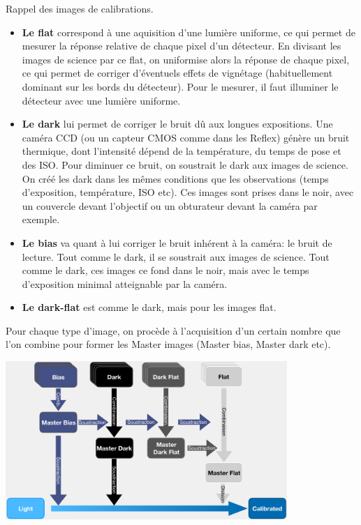 \documentclass[../main/main.tex]{subfiles}
\begin{document}
    \begin{frshaded*}
    \footnotesize
      \centerline{Rappel des images de calibrations.}
      \begin{itemize}
      \item \textbf{Le flat} correspond à une
        aquisition d'une lumière uniforme, ce qui permet de mesurer la réponse
        relative de chaque
        pixel d'un détecteur. En divisant les images de science par ce flat,
        on uniformise alors la réponse de chaque pixel, ce qui permet de
        corriger d'éventuels effets de vignétage (habituellement dominant sur
        les bords du détecteur). Pour le mesurer, il faut illuminer le
        détecteur avec une lumière uniforme. 
        
      \item \textbf{Le dark} lui permet de corriger le bruit dû aux longues
        expositions. Une caméra CCD (ou un capteur CMOS comme dans les
        Reflex) génère un bruit thermique, dont l'intensité dépend de la
        température, du temps de pose et des ISO. Pour diminuer ce bruit, on soustrait le dark aux images de
        science. On créé les dark dans les mêmes conditions que les
        observations (temps d'exposition, température, ISO etc). Ces images sont
        prises dans le noir, avec un couvercle devant
        l'objectif ou un obturateur devant la caméra par exemple.
        
      \item \textbf{Le bias} va quant à lui corriger le bruit inhérent à la
        caméra: le bruit de lecture. Tout comme le dark, il se soustrait
        aux images de science. Tout comme le dark, ces images ce fond
        dans le noir, mais avec le temps d'exposition minimal
        atteignable par la caméra.

      \item \textbf{Le dark-flat} est comme le dark, mais pour les
        images flat.
    \end{itemize}
    Pour chaque type d'image, on procède à l'acquisition d'un certain
    nombre que l'on combine pour former les Master images (Master bias,
    Master dark etc).
    \begin{center}
      \includegraphics[width=0.8\textwidth]{../figures/03_sedm/calibdag.png}
      \captionsetup{font=footnotesize}
    \end{center}
  \end{frshaded*}
\end{document}
